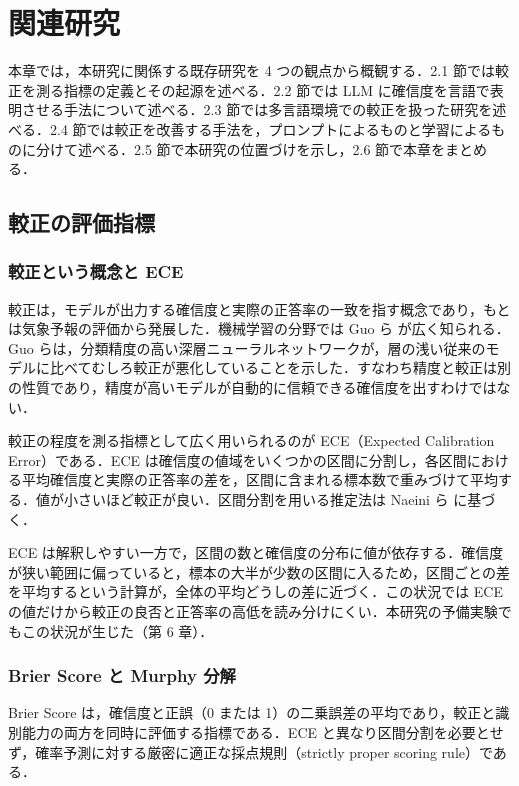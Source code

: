 \section{関連研究}

本章では，本研究に関係する既存研究を 4 つの観点から概観する．2.1 節では較正を測る指標の定義とその起源を述べる．2.2 節では LLM に確信度を言語で表明させる手法について述べる．2.3 節では多言語環境での較正を扱った研究を述べる．2.4 節では較正を改善する手法を，プロンプトによるものと学習によるものに分けて述べる．2.5 節で本研究の位置づけを示し，2.6 節で本章をまとめる．

\subsection{較正の評価指標}

\subsubsection{較正という概念と ECE}

較正は，モデルが出力する確信度と実際の正答率の一致を指す概念であり，もとは気象予報の評価から発展した．機械学習の分野では Guo ら \cite{guo2017calibration} が広く知られる．Guo らは，分類精度の高い深層ニューラルネットワークが，層の浅い従来のモデルに比べてむしろ較正が悪化していることを示した．すなわち精度と較正は別の性質であり，精度が高いモデルが自動的に信頼できる確信度を出すわけではない．

較正の程度を測る指標として広く用いられるのが ECE（Expected Calibration Error）である．ECE は確信度の値域をいくつかの区間に分割し，各区間における平均確信度と実際の正答率の差を，区間に含まれる標本数で重みづけて平均する．値が小さいほど較正が良い．区間分割を用いる推定法は Naeini ら \cite{naeini2015binning} に基づく．

ECE は解釈しやすい一方で，区間の数と確信度の分布に値が依存する．確信度が狭い範囲に偏っていると，標本の大半が少数の区間に入るため，区間ごとの差を平均するという計算が，全体の平均どうしの差に近づく．この状況では ECE の値だけから較正の良否と正答率の高低を読み分けにくい．本研究の予備実験でもこの状況が生じた（第 6 章）．

\subsubsection{Brier Score と Murphy 分解}

Brier Score は，確信度と正誤（0 または 1）の二乗誤差の平均であり，較正と識別能力の両方を同時に評価する指標である．ECE と異なり区間分割を必要とせず，確率予測に対する厳密に適正な採点規則（strictly proper scoring rule）である．

